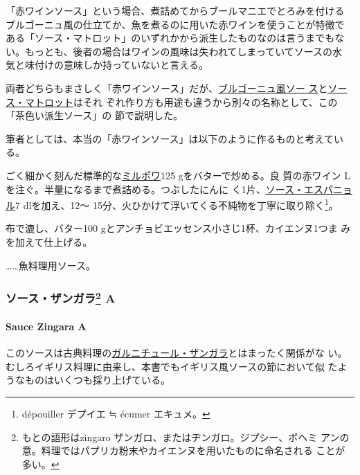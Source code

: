 「赤ワインソース」という場合、煮詰めてからブールマニエでとろみを付ける
ブルゴーニュ風の仕立てか、魚を煮るのに用いた赤ワインを使うことが特徴で
ある「ソース・マトロット」のいずれかから派生したものなのは言うまでもな
い。もっとも、後者の場合はワインの風味は失われてしまっていてソースの水
気と味付けの意味しか持っていないと言える。

両者どちらもまさしく「赤ワインソース」だが、\protect\hyperlink{sauce-bourguignonne}{ブルゴーニュ風ソー
ス}と\protect\hyperlink{sauce-matelote}{ソース・マトロット}はそれ
ぞれ作り方も用途も違うから別々の名称として、この「茶色い派生ソース」の
節で説明した。

筆者としては、本当の「赤ワインソース」は以下のように作るものと考えてい
る。

ごく細かく刻んだ標準的な\protect\hyperlink{mirepoix}{ミルポワ}125
gをバターで炒める。良 質の赤ワイン\undemi{}
Lを注ぐ。半量になるまで煮詰める。つぶしたにんに
く1片、\protect\hyperlink{sauce-espagnole}{ソース・エスパニョル}7\undemi{}
dlを加え、12〜
15分、火ひかけて浮いてくる不純物を丁寧に取り除く\footnote{dépouiller
  デプイエ ≒ écumer エキュメ。}。

布で漉し、バター100 gとアンチョビエッセンス小さじ1杯、カイエンヌ1つま
みを加えて仕上げる。

\ldots{}\ldots{}魚料理用ソース。

\maeaki

\hypertarget{ux30bdux30fcux30b9ux30b6ux30f3ux30acux30e997-a}{%
\subsubsection[ソース・ザンガラ
A]{\texorpdfstring{ソース・ザンガラ\footnote{もとの語形はzingaro
  ザンガロ、またはヂンガロ。ジプシー、ボヘミ
  アンの意。料理ではパプリカ粉末やカイエンヌを用いたものに命名される
  ことが多い。}
A}{ソース・ザンガラ A}}\label{ux30bdux30fcux30b9ux30b6ux30f3ux30acux30e997-a}}

\hypertarget{sauce-zingara-a}{%
\paragraph{Sauce Zingara A}\label{sauce-zingara-a}}

   

このソースは古典料理の\href{}{ガルニチュール・ザンガラ}とはまったく関係がな
い。むしろイギリス料理に由来し、本書でもイギリス風ソースの節において似
たようなものはいくつも採り上げている。

